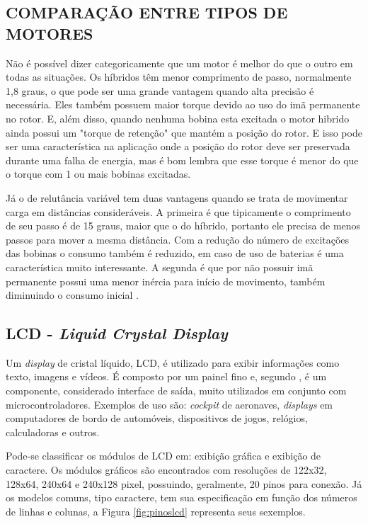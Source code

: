 \subsection{COMPARAÇÃO ENTRE TIPOS DE MOTORES}
Não é possível dizer categoricamente que um motor é melhor do que o outro em todas as situações. Os híbridos têm menor comprimento de passo, normalmente 1,8 graus, o que pode ser uma grande vantagem quando alta precisão é necessária. Eles também possuem maior torque devido ao uso do imã permanente no rotor. E, além disso, quando nenhuma bobina esta excitada o motor hibrido ainda possui um "torque de retenção" que mantém a posição do rotor. E isso pode ser uma característica na aplicação onde a posição do rotor deve ser preservada durante uma falha de energia, mas é bom lembra que esse torque é menor do que o torque com 1 ou mais bobinas excitadas.

Já o de relutância variável tem duas vantagens quando se trata de movimentar carga em distâncias consideráveis. A primeira é que tipicamente o comprimento de seu passo é de 15 graus, maior que o do híbrido, portanto ele precisa de menos passos para mover a mesma distância. Com a redução do número de excitações das bobinas o consumo também é reduzido, em caso de uso de baterias é uma característica muito interessante. A segunda é que por não possuir imã permanente possui uma menor inércia para início de movimento, também diminuindo o consumo inicial \cite{acarnley2002stepping}.

\subsection{LCD - \emph{Liquid Crystal Display}}
Um \emph{display} de cristal líquido, LCD, é utilizado para exibir informações como texto, imagens e vídeos. É composto por um painel fino e, segundo \cite{lcd1996unicamp}, é um componente, considerado interface de saída, muito utilizados em conjunto com microcontroladores. Exemplos de uso são: \emph{cockpit} de aeronaves, \emph{displays} em computadores de bordo de automóveis, dispositivos de jogos, relógios, calculadoras e outros.

Pode-se classificar os módulos de LCD em: exibição gráfica e exibição de caractere. Os módulos gráficos são encontrados com resoluções de 122x32, 128x64, 240x64 e 240x128 pixel, possuindo, geralmente, 20 pinos para conexão. Já os modelos comuns, tipo caractere, tem sua especificação em função dos números de linhas e colunas, a Figura \ref{fig:pinoslcd} representa seus sexemplos.

